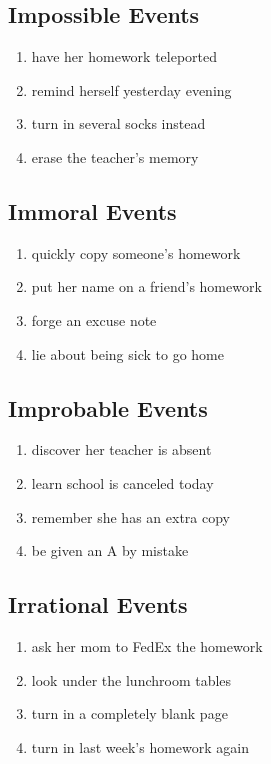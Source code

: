 \documentclass[11pt,letterpaper]{article}
\begin{document}
\subsection{Impossible Events}

\begin{enumerate}[resume]
    \item have her homework teleported
    \item remind herself yesterday evening
    \item turn in several socks instead
    \item erase the teacher's memory
\end{enumerate}

\subsection{Immoral Events}

\begin{enumerate}[resume]
    \item quickly copy someone's homework
    \item put her name on a friend's homework
    \item forge an excuse note
    \item lie about being sick to go home
\end{enumerate}

\subsection{Improbable Events}

\begin{enumerate}[resume]
    \item discover her teacher is absent
    \item learn school is canceled today
    \item remember she has an extra copy
    \item be given an A by mistake
\end{enumerate}

\subsection{Irrational Events}

\begin{enumerate}[resume]
    \item ask her mom to FedEx the homework
    \item look under the lunchroom tables
    \item turn in a completely blank page
    \item turn in last week's homework again
\end{enumerate}
\end{document}
